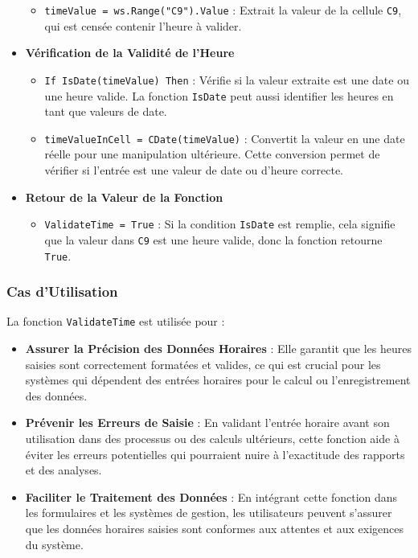\documentclass[a4paper, oneside, 12pt, final]{extreport}
\begin{document}
\begin{itemize}
\begin{itemize}
    \item \texttt{timeValue = ws.Range("C9").Value} : Extrait la valeur de la cellule \texttt{C9}, qui est censée contenir l'heure à valider.
\end{itemize}

\item\textbf{Vérification de la Validité de l'Heure}

\begin{itemize}
    \item \texttt{If IsDate(timeValue) Then} : Vérifie si la valeur extraite est une date ou une heure valide. La fonction \texttt{IsDate} peut aussi identifier les heures en tant que valeurs de date.
    \item \texttt{timeValueInCell = CDate(timeValue)} : Convertit la valeur en une date réelle pour une manipulation ultérieure. Cette conversion permet de vérifier si l'entrée est une valeur de date ou d'heure correcte.
\end{itemize}

\item\textbf{Retour de la Valeur de la Fonction}

\begin{itemize}
    \item \texttt{ValidateTime = True} : Si la condition \texttt{IsDate} est remplie, cela signifie que la valeur dans \texttt{C9} est une heure valide, donc la fonction retourne \texttt{True}.
\end{itemize}
\end{itemize}

\subsubsection{Cas d'Utilisation}

La fonction \texttt{ValidateTime} est utilisée pour :

\begin{itemize}
    \item \textbf{Assurer la Précision des Données Horaires} : Elle garantit que les heures saisies sont correctement formatées et valides, ce qui est crucial pour les systèmes qui dépendent des entrées horaires pour le calcul ou l'enregistrement des données.
    \item \textbf{Prévenir les Erreurs de Saisie} : En validant l'entrée horaire avant son utilisation dans des processus ou des calculs ultérieurs, cette fonction aide à éviter les erreurs potentielles qui pourraient nuire à l'exactitude des rapports et des analyses.
    \item \textbf{Faciliter le Traitement des Données} : En intégrant cette fonction dans les formulaires et les systèmes de gestion, les utilisateurs peuvent s'assurer que les données horaires saisies sont conformes aux attentes et aux exigences du système.
\end{itemize}
\end{document}
